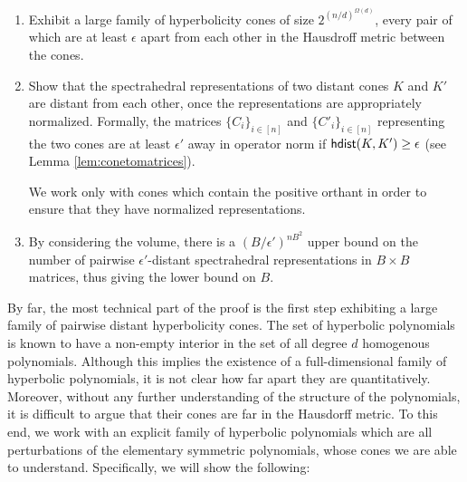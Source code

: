 \begin{enumerate}
	\item Exhibit a large family of hyperbolicity cones of size
		$2^{(n/d)^{\Omega(d)}}$, every pair of which are at least
		$\epsilon$ apart from each other in the Hausdroff metric
		between the cones.  

\item  Show that the spectrahedral representations of two distant cones $K$ and
	$K'$ are distant from each other, once the representations are
		appropriately normalized.  Formally, the matrices $\{C_i\}_{i
		\in [n]}$ and $\{C'_i\}_{i \in [n]}$ representing the two cones
		are at least $\epsilon'$ away in operator norm if $\mathsf{hdist}(K,K')
		\geq \epsilon$ (see Lemma \ref{lem:conetomatrices}). 

		We work only with cones which contain the positive orthant in order to ensure
		that they have normalized representations.

\item By considering the volume, there is a $(B/\epsilon')^{nB^2}$ upper bound
	on the number of pairwise $\epsilon'$-distant spectrahedral
		representations in $B\times B$ matrices, thus giving the lower
		bound on $B$.

\end{enumerate}

By far, the most technical part of the proof is the first step exhibiting a large family of pairwise distant hyperbolicity cones.  
%
The set of hyperbolic polynomials is known to have a non-empty interior in the
set of all degree $d$ homogenous polynomials.  Although this implies the
existence of a full-dimensional family of hyperbolic polynomials, it is not
clear how far apart they are quantitatively. Moreover, without any further understanding
of the structure of the polynomials, it is difficult to argue that their cones are far
in the Hausdorff metric.
%
To this end, we work with an explicit family of hyperbolic polynomials which
are all perturbations of the elementary symmetric polynomials, whose cones we
are able to understand.  Specifically, we will show the following:

